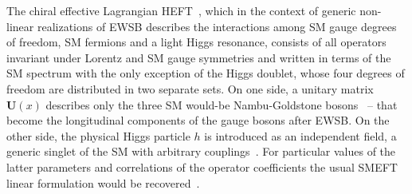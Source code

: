 \documentclass[11pt]{article}
\newcommand{\U}{\mathbf{U}}
\renewcommand{\[}{\begin{equation}}
\renewcommand{\]}{\end{equation}}
\begin{document}
The chiral effective Lagrangian HEFT~\cite{Feruglio:1992wf,Alonso:2012jc,Azatov:2012bz,Alonso:2012px,Alonso:2012pz,Buchalla:2013rka,Brivio:2013pma,Gavela:2014vra,Gavela:2014uta,Brivio:2014pfa,Alonso:2014wta,Hierro:2015nna,Brivio:2015kia, Brivio:2016fzo,Merlo:2016prs}, which
in the context of generic non-linear realizations of EWSB describes the interactions among SM gauge degrees of freedom, SM fermions and a light Higgs resonance,  
   consists of all operators invariant under Lorentz and SM gauge symmetries and written in terms 
of the SM spectrum with the only exception of the Higgs doublet, whose four degrees of freedom are distributed in two separate sets. On one side, a unitary matrix $\U(x)$ describes only the 
three SM would-be Nambu-Goldstone bosons~\cite{Appelquist:1980vg,Longhitano:1980iz,Longhitano:1980tm,Feruglio:1992wf} -- that become the longitudinal components of the gauge 
bosons after EWSB. On the other side, the physical Higgs particle $h$ is introduced as an independent field, a generic singlet of the SM 
 with arbitrary couplings~\cite{Feruglio:1992wf,Grinstein:2007iv,Azatov:2012bz, Alonso:2012px, Alonso:2012pz}. 
 For particular values of the latter parameters and correlations of the operator coefficients the usual SMEFT linear 
 formulation would be recovered~\cite{Alonso:2015fsp,Alonso:2016btr,Alonso:2016oah,Alonso:2012px,Brivio:2013pma,Brivio:2014pfa, Gavela:2014vra,Alonso:2014wta,Hierro:2015nna,Brivio:2015kia,Eboli:2016kko,Brivio:2016fzo,Merlo:2016prs}.
\end{document}
